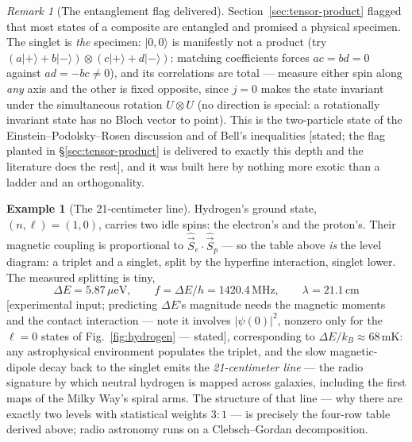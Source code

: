 \documentclass[11pt]{article}
\theoremstyle{plain}
\theoremstyle{definition}
\newtheorem{example}[theorem]{Example}
\theoremstyle{remark}
\newtheorem{remark}[theorem]{Remark}
\newcommand{\op}[1]{\hat{#1}}
\newcommand{\ket}[1]{\lvert #1 \rangle}
\begin{document}
\begin{remark}[The entanglement flag delivered]
\label{rem:singlet-entangled}
Section~\ref{sec:tensor-product} flagged that most states of a
composite are entangled and promised a physical specimen. The
singlet is \emph{the} specimen: $\ket{0,0}$ is manifestly not a
product (try $(a\ket+ + b\ket-)\otimes(c\ket+ + d\ket-)$: matching
coefficients forces $ac = bd = 0$ against $ad = -bc \ne 0$), and
its correlations are total --- measure either spin along \emph{any}
axis and the other is fixed opposite, since $j = 0$ makes the state
invariant under the simultaneous rotation $U\otimes U$ (no
direction is special: a rotationally invariant state has no Bloch
vector to point). This is the two-particle state of the
Einstein--Podolsky--Rosen discussion and of Bell's inequalities
[stated; the flag planted in \S\ref{sec:tensor-product} is delivered
to exactly this depth and the literature does the rest], and it was
built here by nothing more exotic than a ladder and an
orthogonality.
\end{remark}

\begin{example}[The 21-centimeter line]
\label{ex:21cm}
Hydrogen's ground state, $(n, \ell) = (1, 0)$, carries two idle
spins: the electron's and the proton's. Their magnetic coupling is
proportional to $\op{\vec S}_e\!\cdot\op{\vec S}_p$ --- so the
table above \emph{is} the level diagram: a triplet and a singlet,
split by the hyperfine interaction, singlet lower. The measured
splitting is tiny,
\begin{equation}
  \Delta E = 5.87\,\mu\mathrm{eV},
  \qquad
  f = \Delta E/h = 1420.4\,\mathrm{MHz},
  \qquad
  \lambda = 21.1\,\mathrm{cm}
\end{equation}
[experimental input; predicting $\Delta E$'s magnitude needs the
magnetic moments and the contact interaction --- note it involves
$|\psi(0)|^2$, nonzero only for the $\ell = 0$ states of
Fig.~\ref{fig:hydrogen} --- stated], corresponding to
$\Delta E/k_B \approx 68\,\mathrm{mK}$: any astrophysical
environment populates the triplet, and the slow magnetic-dipole
decay back to the singlet emits the \emph{21-centimeter line} ---
the radio signature by which neutral hydrogen is mapped across
galaxies, including the first maps of the Milky Way's spiral arms.
The structure of that line --- why there are exactly two levels
with statistical weights $3 : 1$ --- is precisely the four-row
table derived above; radio astronomy runs on a Clebsch--Gordan
decomposition.
\end{example}
\end{document}
